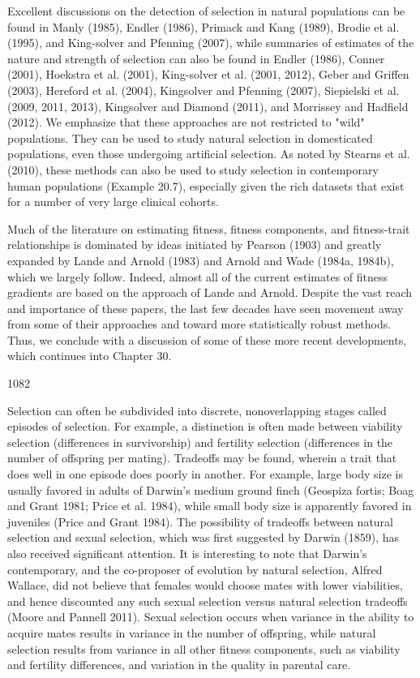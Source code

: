 \documentclass{article}
\begin{document}
Excellent discussions on the detection of selection in natural populations can be found in Manly (1985), Endler (1986), Primack and Kang (1989), Brodie et al. (1995), and King-solver and Pfenning (2007), while summaries of estimates of the nature and strength of selection can also be found in Endler (1986), Conner (2001), Hoekstra et al. (2001), King-solver et al. (2001, 2012), Geber and Griffen (2003), Hereford et al. (2004), Kingsolver and Pfenning (2007), Siepielski et al. (2009, 2011, 2013), Kingsolver and Diamond (2011), and Morrissey and Hadfield (2012). We emphasize that these approaches are not restricted to "wild" populations. They can be used to study natural selection in domesticated populations, even those undergoing artificial selection. As noted by Stearns et al. (2010), these methods can also be used to study selection in contemporary human populations (Example 20.7), especially given the rich datasets that exist for a number of very large clinical cohorts.

Much of the literature on estimating fitness, fitness components, and fitness-trait relationships is dominated by ideas initiated by Pearson (1903) and greatly expanded by Lande and Arnold (1983) and Arnold and Wade (1984a, 1984b), which we largely follow. Indeed, almost all of the current estimates of fitness gradients are based on the approach of Lande and Arnold. Despite the vast reach and importance of these papers, the last few decades have seen movement away from some of their approaches and toward more statistically robust methods. Thus, we conclude with a discussion of some of these more recent developments, which continues into Chapter 30.

1082

Selection can often be subdivided into discrete, nonoverlapping stages called episodes of selection. For example, a distinction is often made between viability selection (differences in survivorship) and fertility selection (differences in the number of offspring per mating). Tradeoffs may be found, wherein a trait that does well in one episode does poorly in another. For example, large body size is usually favored in adults of Darwin's medium ground finch (Geospiza fortis; Boag and Grant 1981; Price et al. 1984), while small body size is apparently favored in juveniles (Price and Grant 1984). The possibility of tradeoffs between natural selection and sexual selection, which was first suggested by Darwin (1859), has also received significant attention. It is interesting to note that Darwin's contemporary, and the co-proposer of evolution by natural selection, Alfred Wallace, did not believe that females would choose mates with lower viabilities, and hence discounted any such sexual selection versus natural selection tradeoffs (Moore and Pannell 2011). Sexual selection occurs when variance in the ability to acquire mates results in variance in the number of offspring, while natural selection results from variance in all other fitness components, such as viability and fertility differences, and variation in the quality in parental care.
\end{document}
